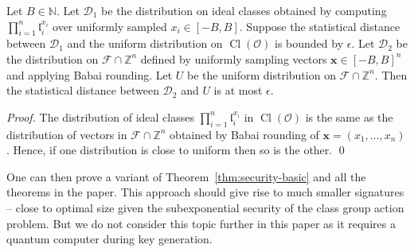 \documentclass{llncs}
\newcommand{\D}{\mathcal{D}}
\newcommand{\FF}{\mathcal{F}}
\newcommand{\N}{\mathbb{N}}
\newcommand{\OO}{\mathcal{O}}
\newcommand{\Z}{\mathbb{Z}}
\DeclareMathOperator{\Cl}{Cl}
\renewcommand{\l}{\mathfrak{l}}
\newcommand{\x}{\mathbf{x}}
\begin{document}
\begin{lemma} \label{lem:sim1}
Let $B \in \N$. Let $\D_1$ be the distribution on ideal classes obtained by computing $\prod_{i=1}^n \l_i^{x_i}$ over uniformly sampled $x_i \in [-B,B]$.
Suppose the statistical distance between $\D_1$ and the uniform distribution on $\Cl(\OO)$ is bounded by $\epsilon$.
Let $\D_2$ be the distribution on $\FF \cap \Z^n$ defined by uniformly sampling vectors $\x \in [-B,B]^n$ and applying Babai rounding.
Let $U$ be the uniform distribution on $\FF \cap \Z^n$.
Then the statistical distance between $\D_2$ and $U$ is at most $\epsilon$.
\end{lemma}



\begin{proof}
The distribution of ideal classes $\prod_{i=1}^n \l_i^{x_i}$ in $\Cl(\OO)$ is the same as the distribution of vectors in $\FF \cap \Z^n$ obtained by Babai rounding of $\x=(x_1, \dots, x_n)$.
Hence, if one distribution is close to uniform then so is the other.
\qed
\end{proof}


One can then prove a variant of Theorem~\ref{thm:security-basic} and all the theorems in the paper. This approach should give rise to much smaller signatures -- close to optimal size given the subexponential security of the class group action problem.
But we do not consider this topic further in this paper as it requires a quantum computer during key generation.
\end{document}
